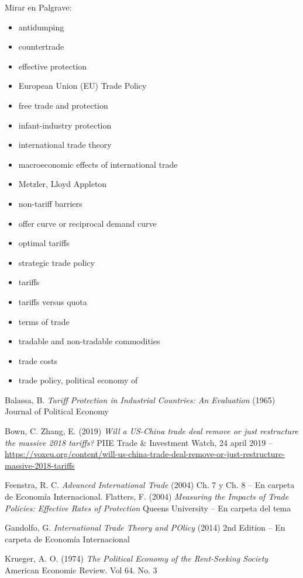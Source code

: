 \documentclass{nuevotema}
\begin{document}
Mirar en Palgrave:
\begin{itemize}
	\item antidumping
	\item countertrade
	\item effective protection
	\item European Union (EU) Trade Policy
	\item free trade and protection
	\item infant-industry protection
	\item international trade theory
	\item macroeconomic effects of international trade
	\item Metzler, Lloyd Appleton
	\item non-tariff barriers
	\item offer curve or reciprocal demand curve
	\item optimal tariffs
	\item strategic trade policy
	\item tariffs
	\item tariffs versus quota
	\item terms of trade
	\item tradable and non-tradable commodities
	\item trade costs
	\item trade policy, political economy of
\end{itemize}

Balassa, B. \textit{Tariff Protection in Industrial Countries: An Evaluation} (1965) Journal of Political Economy

Bown, C. Zhang, E. (2019) \textit{Will a US-China trade deal remove or just restructure the massive 2018 tariffs?} PIIE Trade \& Investment Watch, 24 april 2019 -- \url{https://voxeu.org/content/will-us-china-trade-deal-remove-or-just-restructure-massive-2018-tariffs}

Feenstra, R. C. \textit{Advanced International Trade} (2004) Ch. 7 y Ch. 8 -- En carpeta de Economía Internacional. 
Flatters, F. (2004) \textit{Measuring the Impacts of Trade Policies: Effective Rates of Protection} Queens University -- En carpeta del tema

Gandolfo, G. \textit{International Trade Theory and POlicy} (2014) 2nd Edition -- En carpeta de Economía Internacional

Krueger, A. O. (1974) \textit{The Political Economy of the Rent-Seeking Society} American Economic Review. Vol 64. No. 3
\end{document}
